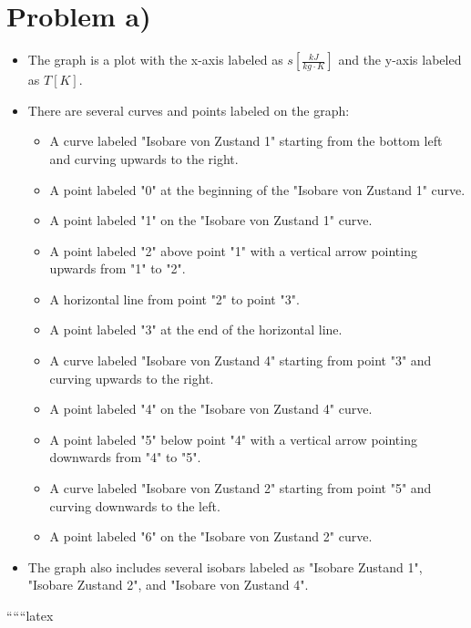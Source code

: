 \section*{Problem a)}

\begin{itemize}
    \item The graph is a plot with the x-axis labeled as $s \left[ \frac{kJ}{kg \cdot K} \right]$ and the y-axis labeled as $T \left[ K \right]$.
    \item There are several curves and points labeled on the graph:
        \begin{itemize}
            \item A curve labeled "Isobare von Zustand 1" starting from the bottom left and curving upwards to the right.
            \item A point labeled "0" at the beginning of the "Isobare von Zustand 1" curve.
            \item A point labeled "1" on the "Isobare von Zustand 1" curve.
            \item A point labeled "2" above point "1" with a vertical arrow pointing upwards from "1" to "2".
            \item A horizontal line from point "2" to point "3".
            \item A point labeled "3" at the end of the horizontal line.
            \item A curve labeled "Isobare von Zustand 4" starting from point "3" and curving upwards to the right.
            \item A point labeled "4" on the "Isobare von Zustand 4" curve.
            \item A point labeled "5" below point "4" with a vertical arrow pointing downwards from "4" to "5".
            \item A curve labeled "Isobare von Zustand 2" starting from point "5" and curving downwards to the left.
            \item A point labeled "6" on the "Isobare von Zustand 2" curve.
        \end{itemize}
    \item The graph also includes several isobars labeled as "Isobare Zustand 1", "Isobare Zustand 2", and "Isobare von Zustand 4".
\end{itemize}

``````latex